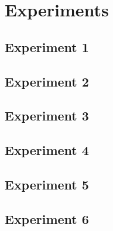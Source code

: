 \chapter{Experiments}

\section{Experiment 1}
\section{Experiment 2}
\section{Experiment 3}
\section{Experiment 4}
\section{Experiment 5}
\section{Experiment 6}
